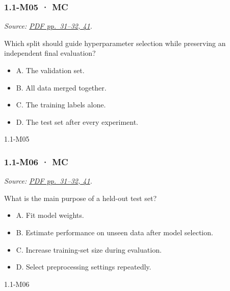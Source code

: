 \noindent\begin{minipage}{\linewidth}

\subsubsection{1.1-M05 · MC}\label{m05-mc}

\emph{Source:
\href{../Lecture\%20Slides/1.1.\%20Fundamentals.pdf\#page=31}{PDF
pp.~31--32, 41}.}

Which split should guide hyperparameter selection while preserving an
independent final evaluation?

\begin{itemize}
\tightlist
\item
  A. The validation set.
\item
  B. All data merged together.
\item
  C. The training labels alone.
\item
  D. The test set after every experiment.
\end{itemize}

\begin{solution}[8mm]{1.1-M05}

\end{solution}
\end{minipage}\par\medskip

\noindent\begin{minipage}{\linewidth}

\subsubsection{1.1-M06 · MC}\label{m06-mc}

\emph{Source:
\href{../Lecture\%20Slides/1.1.\%20Fundamentals.pdf\#page=31}{PDF
pp.~31--32, 41}.}

What is the main purpose of a held-out test set?

\begin{itemize}
\tightlist
\item
  A. Fit model weights.
\item
  B. Estimate performance on unseen data after model selection.
\item
  C. Increase training-set size during evaluation.
\item
  D. Select preprocessing settings repeatedly.
\end{itemize}

\begin{solution}[8mm]{1.1-M06}

\end{solution}
\end{minipage}\par\medskip

